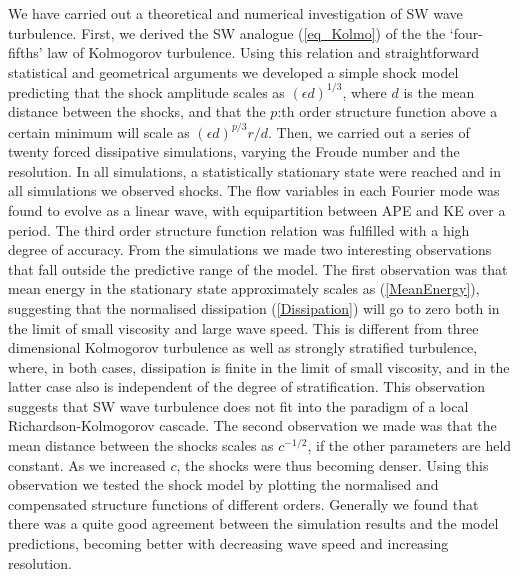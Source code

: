 \documentclass{jfm}
\begin{document}
We have carried out a theoretical and numerical investigation of SW wave turbulence. First, we derived the SW analogue (\ref{eq_Kolmo}) of the the `four-fifths' law of Kolmogorov turbulence. Using this relation and straightforward statistical and geometrical arguments we developed a simple shock model predicting that the shock amplitude scales as $ (\epsilon d)^{1/3} $, where $ d $ is the mean distance between the shocks, and that the $ p $:th order structure function above a certain minimum will scale as $ (\epsilon d)^{p/3} r/d $. Then, we carried out a series of twenty forced dissipative simulations, varying the Froude number and the resolution. In all simulations, a statistically stationary state were reached and in all simulations we observed shocks. The flow variables in each Fourier mode was found to evolve as a linear wave, with equipartition between APE and KE over a period. The third order structure function relation was fulfilled with a high degree of accuracy. From the simulations we made two interesting observations that fall outside the predictive range of the model. The first observation  was  that mean energy in the stationary state approximately scales as (\ref{MeanEnergy}), suggesting that the normalised dissipation (\ref{Dissipation}) will go to zero both in the limit of small viscosity and large  wave speed. This is different from three dimensional Kolmogorov turbulence as well as strongly stratified turbulence, where, in both cases, dissipation is finite in the limit of small viscosity, and in the latter case also is independent of the degree of stratification. This observation suggests that SW wave turbulence does not fit into the paradigm of a local Richardson-Kolmogorov cascade. The second observation we made was that the mean distance between the shocks scales as $ c^{-1/2} $, if the other parameters are held constant. As we increased $ c $, the shocks were thus becoming denser. Using this observation we tested the shock model by plotting the normalised and compensated structure functions of different orders. Generally we found that there was a quite good agreement between the simulation results and the model predictions, becoming better with decreasing  wave speed and increasing resolution. 
\end{document}
